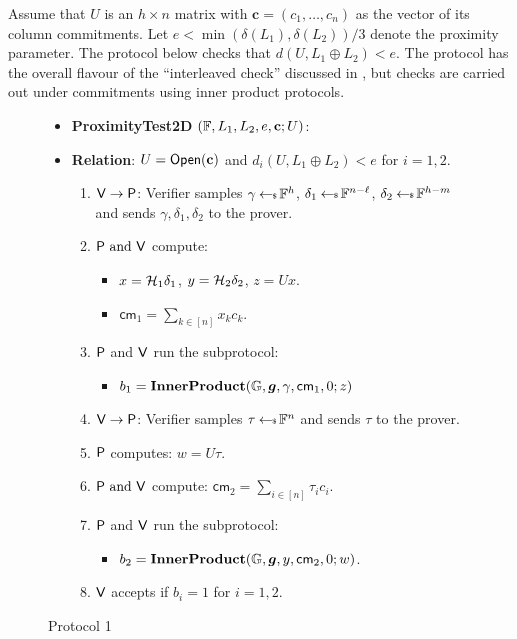 Assume that $U$ is an $h\times n$ matrix with $\mathbf{c}=(c_1,\ldots,c_n)$ as
the vector of its column commitments. Let $e < \min(\delta(L_1),\delta(L_2))/3$
denote the proximity parameter. The protocol below checks that $d(U,L_1\oplus
L_2)<e$. 
The protocol has the overall flavour of the
``interleaved check'' discussed in \cite{ligero}, but checks are
carried out under commitments using inner product protocols.
\begin{figure}[ht]
\begin{framed}
\begin{itemize}
\item {\bf ProximityTest2D} $(\mathbb{F}, L_1, L_2, e, \mathbf{c}; U)$:
\item {\bf Relation}: $U=\mathsf{Open}(\mathbf{c})$ and $d_i(U,L_1\oplus
L_2)<e$ for $i=1,2$.
\begin{enumerate}[{\rm 1.}]
\item $\mathsf{V}\rightarrow \mathsf{P}$: Verifier samples $\gamma\hskip2.3pt{\gets\!\!\mbox{\tiny${\$}$\normalsize}}\,
\mathbb{F}^h$, $\delta_1\hskip2.3pt{\gets\!\!\mbox{\tiny${\$}$\normalsize}}\, \mathbb{F}^{n-\ell}$, $\delta_2\hskip2.3pt{\gets\!\!\mbox{\tiny${\$}$\normalsize}}\, \mathbb{F}^{h-m}$ and sends
$\gamma,\delta_1, \delta_2$ to the prover.
\item $\mathsf{P} \text{ and } \mathsf{V}$ compute:
	\begin{itemize}
	\item $x = \mathcal{H}_1\delta_1$, $y = \mathcal{H}_2\delta_2$, $z=Ux$.
	\item $\mathsf{cm}_1 = \sum_{k\in [n]}x_kc_k$.
	\end{itemize}
\item $\mathsf{P}$ and $\mathsf{V}$ run the subprotocol:
	\begin{itemize}
	\item $b_1=\mathbf{InnerProduct}(\mathbb{G},\bm{g},\gamma,\mathsf{cm}_1,0;z)$
	\end{itemize}
\item $\mathsf{V}\rightarrow \mathsf{P}$: Verifier samples $\tau\hskip2.3pt{\gets\!\!\mbox{\tiny${\$}$\normalsize}}\, \mathbb{F}^n$ and
sends $\tau$ to the prover.
\item $\mathsf{P}$ computes: $w=U\tau$.
\item $\mathsf{P} \text{ and } \mathsf{V}$ compute: $\mathsf{cm}_2=\sum_{i\in
[n]}\tau_ic_i$.
\item $\mathsf{P}$ and $\mathsf{V}$ run the subprotocol:
	\begin{itemize}
	\item $b_2=\mathbf{InnerProduct}(\mathbb{G},\bm{g},y,\mathsf{cm}_2,0;w)$.
	\end{itemize}
\item $\mathsf{V}$ accepts if $b_i=1$ for $i=1,2$.
\end{enumerate}
\end{itemize}
\end{framed}
\caption{Protocol 1}
\label{fig:protocol1}
\end{figure}

